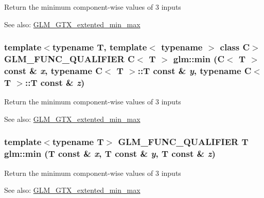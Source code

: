 Return the minimum component-wise values of 3 inputs \begin{Desc}
\item[See also:]\hyperlink{group__gtx__extented__min__max}{GLM\_\-GTX\_\-extented\_\-min\_\-max} \end{Desc}
\hypertarget{group__gtx__extented__min__max_gd88885e3f9bbaeab162e9ea22db68858}{
\subsubsection[min]{\setlength{\rightskip}{0pt plus 5cm}template$<$typename T, template$<$ typename $>$ class C$>$ GLM\_\-FUNC\_\-QUALIFIER C$<$ T $>$ glm::min (C$<$ T $>$ const \& {\em x}, \/  typename C$<$ T $>$::T const \& {\em y}, \/  typename C$<$ T $>$::T const \& {\em z})}}
\label{group__gtx__extented__min__max_gd88885e3f9bbaeab162e9ea22db68858}


Return the minimum component-wise values of 3 inputs \begin{Desc}
\item[See also:]\hyperlink{group__gtx__extented__min__max}{GLM\_\-GTX\_\-extented\_\-min\_\-max} \end{Desc}
\hypertarget{group__gtx__extented__min__max_gff0ad3009c15ec132717c7150dd96803}{
\subsubsection[min]{\setlength{\rightskip}{0pt plus 5cm}template$<$typename T$>$ GLM\_\-FUNC\_\-QUALIFIER T glm::min (T const \& {\em x}, \/  T const \& {\em y}, \/  T const \& {\em z})}}
\label{group__gtx__extented__min__max_gff0ad3009c15ec132717c7150dd96803}


Return the minimum component-wise values of 3 inputs \begin{Desc}
\item[See also:]\hyperlink{group__gtx__extented__min__max}{GLM\_\-GTX\_\-extented\_\-min\_\-max} \end{Desc}
